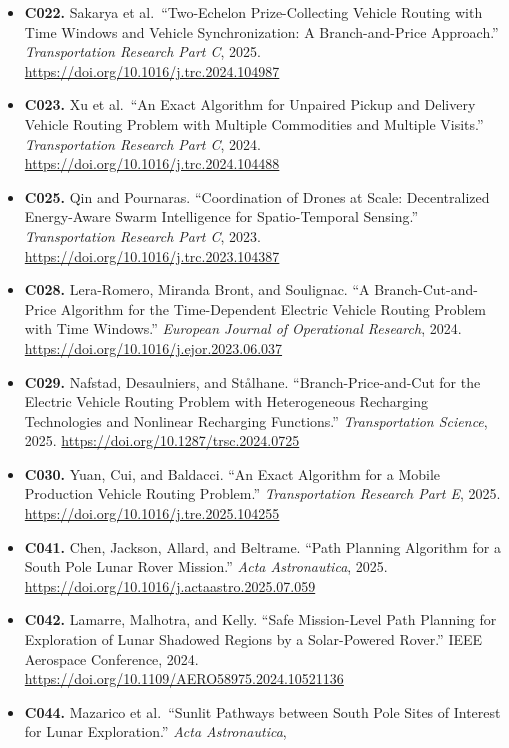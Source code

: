\documentclass[
  11pt,
]{article}
\begin{document}
\begin{itemize}
  \url{https://doi.org/10.1016/j.trc.2023.104374}
\item
  \textbf{C022.} Sakarya et al.~``Two-Echelon Prize-Collecting Vehicle
  Routing with Time Windows and Vehicle Synchronization: A
  Branch-and-Price Approach.'' \emph{Transportation Research Part C},
  2025. \url{https://doi.org/10.1016/j.trc.2024.104987}
\item
  \textbf{C023.} Xu et al.~``An Exact Algorithm for Unpaired Pickup and
  Delivery Vehicle Routing Problem with Multiple Commodities and
  Multiple Visits.'' \emph{Transportation Research Part C}, 2024.
  \url{https://doi.org/10.1016/j.trc.2024.104488}
\item
  \textbf{C025.} Qin and Pournaras. ``Coordination of Drones at Scale:
  Decentralized Energy-Aware Swarm Intelligence for Spatio-Temporal
  Sensing.'' \emph{Transportation Research Part C}, 2023.
  \url{https://doi.org/10.1016/j.trc.2023.104387}
\item
  \textbf{C028.} Lera-Romero, Miranda Bront, and Soulignac. ``A
  Branch-Cut-and-Price Algorithm for the Time-Dependent Electric Vehicle
  Routing Problem with Time Windows.'' \emph{European Journal of
  Operational Research}, 2024.
  \url{https://doi.org/10.1016/j.ejor.2023.06.037}
\item
  \textbf{C029.} Nafstad, Desaulniers, and Stålhane.
  ``Branch-Price-and-Cut for the Electric Vehicle Routing Problem with
  Heterogeneous Recharging Technologies and Nonlinear Recharging
  Functions.'' \emph{Transportation Science}, 2025.
  \url{https://doi.org/10.1287/trsc.2024.0725}
\item
  \textbf{C030.} Yuan, Cui, and Baldacci. ``An Exact Algorithm for a
  Mobile Production Vehicle Routing Problem.'' \emph{Transportation
  Research Part E}, 2025.
  \url{https://doi.org/10.1016/j.tre.2025.104255}
\item
  \textbf{C041.} Chen, Jackson, Allard, and Beltrame. ``Path Planning
  Algorithm for a South Pole Lunar Rover Mission.'' \emph{Acta
  Astronautica}, 2025.
  \url{https://doi.org/10.1016/j.actaastro.2025.07.059}
\item
  \textbf{C042.} Lamarre, Malhotra, and Kelly. ``Safe Mission-Level Path
  Planning for Exploration of Lunar Shadowed Regions by a Solar-Powered
  Rover.'' IEEE Aerospace Conference, 2024.
  \url{https://doi.org/10.1109/AERO58975.2024.10521136}
\item
  \textbf{C044.} Mazarico et al.~``Sunlit Pathways between South Pole
  Sites of Interest for Lunar Exploration.'' \emph{Acta Astronautica},

\end{itemize}
\end{document}
